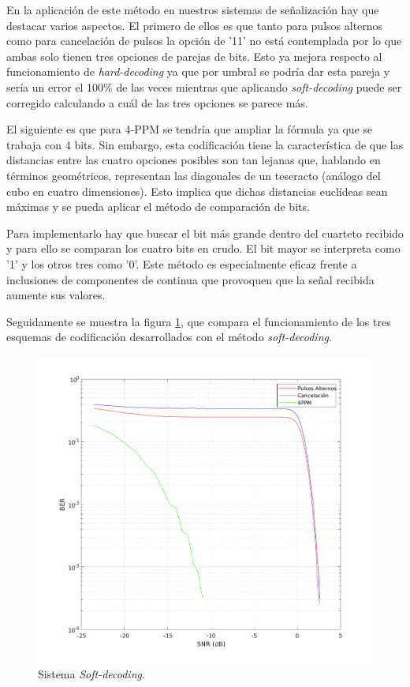 En la aplicación de este método en nuestros sistemas de señalización hay que destacar 
varios aspectos. El primero de ellos es que
tanto para pulsos alternos como para cancelación de pulsos la opción de 
'11' no está contemplada por lo que ambas solo tienen tres opciones de parejas de bits. 
Esto ya mejora respecto al funcionamiento de \textit{hard-decoding} ya que por umbral se 
podría dar esta pareja y sería un error el 100\% de las veces mientras que aplicando 
\textit{soft-decoding} puede ser corregido calculando a cuál de las tres opciones 
se parece más.

El siguiente es que para 4-PPM se tendría que ampliar la fórmula ya que se trabaja
con 4 bits. Sin embargo, esta codificación tiene la característica de que las distancias
entre las cuatro opciones posibles son tan lejanas que,
hablando en términos geométricos, representan las diagonales
de un teseracto (análogo del cubo en cuatro dimensiones). Esto implica que dichas 
distancias euclídeas sean máximas y se pueda aplicar el método de comparación de bits.

Para implementarlo hay que buscar el bit más grande dentro del cuarteto
recibido y para ello se comparan los cuatro bits en crudo. El bit mayor se interpreta 
como '1' y los otros tres como '0'. Este método es especialmente eficaz frente a 
inclusiones de componentes de continua que provoquen que la señal recibida aumente sus 
valores.

Seguidamente se muestra la figura \ref{soft-decoding}, que compara el funcionamiento de 
los tres esquemas de codificación desarrollados con el método \textit{soft-decoding}.

\begin{figure}[ht]
    \centering
    \includegraphics[scale=0.38]{./figuras/Soft.pdf}
    \caption{\small{Sistema \textit{Soft-decoding}.}}
    \label{soft-decoding}%
\end{figure}

